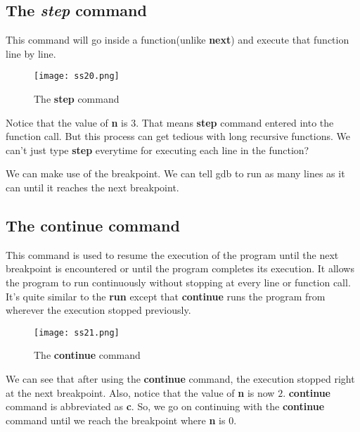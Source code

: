 \documentclass{article}
\makeatletter
\renewcommand\paragraph{\@startsection{paragraph}{4}{\z@}{-3.25ex \@plus -1ex \@minus -.2ex}{1.5ex \@plus .2ex}{\normalfont\normalsize\bfseries}}
\makeatother
\begin{document}
\subsection{The \textit{step} command}
\paragraph{}
This command will go inside a function(unlike \textbf{next}) and execute that function line by line.
\begin{figure}[h]
\centering
\texttt{[image: ss20.png]}
\caption{The \textbf{step} command}
\end{figure}

Notice that the value of \textbf{n} is $3$. That means \textbf{step} command entered into the function call.
But this process can get tedious with long recursive functions. We can't just type \textbf{step} everytime for executing each line in the function?

We can make use of the breakpoint. We can tell gdb to run as many lines as it can until it reaches the next breakpoint.

\newpage
\subsection{The \textbf{continue} command}
\paragraph{}
This command is used to resume the execution of the program until the next breakpoint is encountered or until the program completes its execution. It allows the program to run continuously without stopping at every line or function call. It's quite similar to the \textbf{run} except that \textbf{continue} runs the program from wherever the execution stopped previously.

\begin{figure}[h]
\centering
\texttt{[image: ss21.png]}
\caption{The \textbf{continue} command}
\end{figure}

We can see that after using the \textbf{continue} command, the execution stopped right at the next breakpoint. Also, notice that the value of \textbf{n} is now $2$. \textbf{continue} command is abbreviated as \textbf{c}.
So, we go on continuing with the \textbf{continue} command until we reach the breakpoint where \textbf{n} is $0$.
\end{document}
